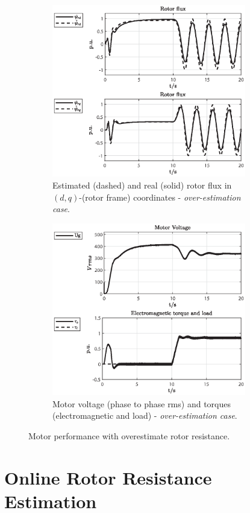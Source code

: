 \documentclass[11pt,a4paper,oneside]{book}
\numberwithin{equation}{section}
\theoremstyle{it}
\theoremstyle{definition}
\begin{document}
\begin{figure}[H]
	\centering
	\begin{subfigure}{0.5\textwidth}
	\centering
	\includegraphics[width = 240pt, keepaspectratio]{figures/over_est/rotor_flux_est_2.eps}
	\captionsetup{width=0.65\textwidth, font=footnotesize}	
	\caption{Estimated (dashed) and real (solid) rotor flux in $(d,q)$-(rotor frame) coordinates - \textit{over-estimation case}.}
	\label{fig_sim_res_11}
	\end{subfigure}%
	\begin{subfigure}{0.5\textwidth}
	\centering
	\includegraphics[width = 240pt, keepaspectratio]{figures/over_est/motor_voltage.eps}
	\captionsetup{width=0.65\textwidth, font=footnotesize}	
	\caption{Motor voltage (phase to phase rms) and torques (electromagnetic and load) - \textit{over-estimation case}.}
	\label{fig_sim_res_12}
	\end{subfigure}		
	\captionsetup{width=0.5\textwidth, font=small}		
	\caption{Motor performance with overestimate rotor resistance.}
	\label{}
\end{figure}

\chapter{Online Rotor Resistance Estimation}
\end{document}
